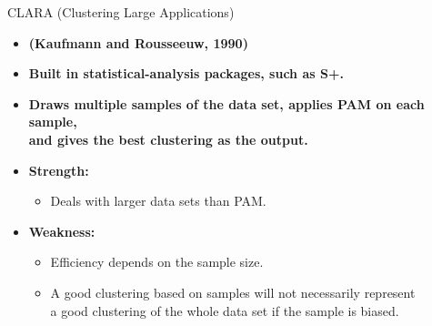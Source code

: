 \documentclass[aspectratio=169,t,xcolor=dvipsnames]{beamer}
\begin{document}
  { %
    \begin{frame}{CLARA (Clustering Large Applications)}
      \begin{itemize}
        \item \textbf{(Kaufmann and Rousseeuw, 1990)}
        \item \textbf{Built in statistical-analysis packages, such as S+.}
        \item \textbf{Draws multiple samples of the data set, applies PAM on each sample,\\
         and gives the best clustering as the output.}
        \item \textbf{Strength:}
        \begin{itemize}
          \item Deals with larger data sets than PAM.
        \end{itemize}
        \item \textbf{Weakness:}
        \begin{itemize}
          \item Efficiency depends on the sample size.
          \item A good clustering based on samples will not necessarily represent \\
          a good clustering of the whole data set if the sample is biased.
        \end{itemize}
      \end{itemize}
    \end{frame}
  }
\end{document}
